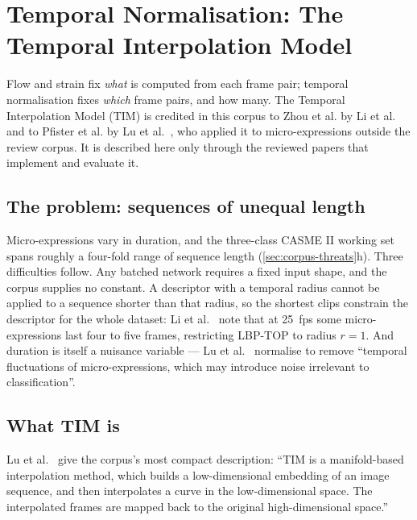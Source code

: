 
\section{Temporal Normalisation: The Temporal Interpolation Model}
\label{sec:tim-review}

Flow and strain fix \textit{what} is computed from each frame pair; temporal normalisation fixes \textit{which} frame pairs, and how many. The Temporal Interpolation Model (TIM) is credited in this corpus to Zhou et al. by Li et al.~\cite{liX2013,liX2018} and to Pfister et al. by Lu et al.~\cite{lu2015}, who applied it to micro-expressions outside the review corpus. It is described here only through the reviewed papers that implement and evaluate it.

\subsection{The problem: sequences of unequal length}
\label{sec:tim-problem}

Micro-expressions vary in duration, and the three-class CASME II working set spans roughly a four-fold range of sequence length (\autoref{sec:corpus-threats}h). Three difficulties follow. Any batched network requires a fixed input shape, and the corpus supplies no constant. A descriptor with a temporal radius cannot be applied to a sequence shorter than that radius, so the shortest clips constrain the descriptor for the whole dataset: Li et al.~\cite{liX2018} note that at 25~fps some micro-expressions last four to five frames, restricting LBP-TOP to radius $r = 1$. And duration is itself a nuisance variable --- Lu et al.~\cite{lu2015} normalise to remove ``temporal fluctuations of micro-expressions, which may introduce noise irrelevant to classification''.

\subsection{What TIM is}
\label{sec:tim-what}

Lu et al.~\cite{lu2015} give the corpus's most compact description: ``TIM is a manifold-based interpolation method, which builds a low-dimensional embedding of an image sequence, and then interpolates a curve in the low-dimensional space. The interpolated frames are mapped back to the original high-dimensional space.''

